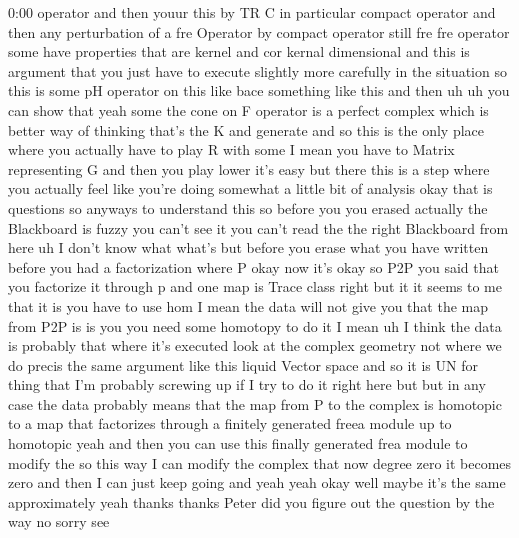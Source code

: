 \begin{unfinished}{0:00}
operator  and  then  youur  this  by  TR  C  in
particular  compact  operator  and  then  any
perturbation  of  a  fre  Operator  by
compact  operator  still  fre  fre  operator
some  have  properties  that  are  kernel  and
cor  kernal  dimensional
and  this  is  argument  that  you  just  have
to  execute  slightly  more  carefully  in
the  situation  so  this  is  some  pH
operator  on  this
like  bace  something  like  this  and  then
uh  uh  you  can  show  that  yeah  some  the
cone  on  F  operator  is  a  perfect  complex
which  is  better  way  of  thinking  that's
the  K  and  generate  and  so  this  is  the
only  place  where  you  actually  have  to
play  R  with  some  I  mean  you  have  to
Matrix  representing  G  and  then  you  play
lower  it's  easy  but  there  this  is  a  step
where  you  actually  feel  like  you're
doing  somewhat  a  little  bit  of  analysis
okay  that
is
questions  so  anyways  to  understand  this
so  before  you  you  erased  actually  the
Blackboard  is  fuzzy  you  can't  see  it  you
can't  read  the  the  right  Blackboard  from
here  uh  I  don't  know  what  what's  but
before  you  erase  what  you  have  written
before  you  had  a
factorization  where  P  okay  now  it's  okay
so  P2P  you  said  that  you  factorize  it
through  p  and  one  map  is  Trace  class
right  but  it  it  seems  to  me  that  it  is
you  have  to  use  hom  I  mean  the  data  will
not  give  you  that  the  map  from  P2P  is  is
you  you  need  some  homotopy  to  do  it  I
mean  uh  I  think  the  data  is  probably
that  where  it's  executed  look  at  the
complex  geometry  not  where  we  do  precis
the  same  argument  like  this  liquid
Vector  space  and
so  it  is  UN  for  thing  that  I'm  probably
screwing  up  if  I  try  to  do  it  right  here
but  but  in  any  case  the  data  probably
means  that  the  map  from  P  to  the  complex
is  homotopic  to  a  map  that  factorizes
through  a  finitely  generated  freea
module  up  to
homotopic  yeah  and  then  you  can  use  this
finally  generated  frea  module  to  modify
the  so  this  way  I  can  modify  the  complex
that  now  degree
zero  it  becomes  zero  and  then  I  can  just
keep  going  and  yeah  yeah  okay  well  maybe
it's  the  same
approximately  yeah  thanks  thanks
Peter  did  you  figure  out  the  question  by
the  way  no
sorry
see
\end{unfinished}